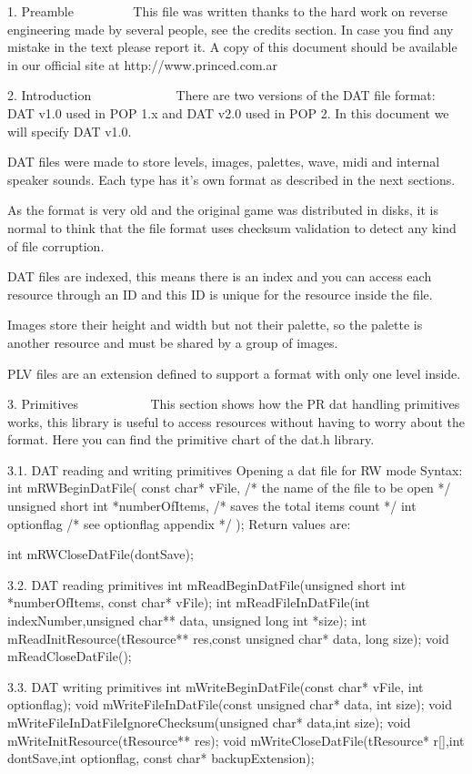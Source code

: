1. Preamble
   ~~~~~~~~
 This file was written thanks to the hard work on reverse engineering made
 by several people, see the credits section. In case you find any mistake
 in the text please report it. A copy of this document should be available
 in our official site at http://www.princed.com.ar


2. Introduction
   ~~~~~~~~~~~~
 There are two versions of the DAT file format: DAT v1.0 used in POP 1.x
 and DAT v2.0 used in POP 2. In this document we will specify DAT v1.0.

 DAT files were made to store levels, images, palettes, wave, midi and
 internal speaker sounds. Each type has it's own format as described in
 the next sections.
 
 As the format is very old and the original game was distributed in disks,
 it is normal to think that the file format uses checksum validation to
 detect any kind of file corruption.

 DAT files are indexed, this means there is an index and you can access
 each resource through an ID and this ID is unique for the resource inside
 the file.

 Images store their height and width but not their palette, so the palette
 is another resource and must be shared by a group of images.

 PLV files are an extension defined to support a format with only one level
 inside.


3. Primitives
   ~~~~~~~~~~
 This section shows how the PR dat handling primitives works, this library
 is useful to access resources without having to worry about the format.
 Here you can find the primitive chart of the dat.h library.

3.1. DAT reading and writing primitives
 Opening a dat file for RW mode
 Syntax:
 int mRWBeginDatFile(
  const char* vFile, /* the name of the file to be open */
  unsigned short int *numberOfItems, /* saves the total items count */
  int optionflag /* see optionflag appendix */
 );
 Return values are:

 int mRWCloseDatFile(dontSave);

3.2. DAT reading primitives
 int  mReadBeginDatFile(unsigned short int *numberOfItems,
      const char* vFile);
 int  mReadFileInDatFile(int indexNumber,unsigned char** data,
      unsigned long int *size);
 int  mReadInitResource(tResource** res,const unsigned char* data,
      long size);
 void mReadCloseDatFile();

3.3. DAT writing primitives
 int  mWriteBeginDatFile(const char* vFile, int optionflag);
 void mWriteFileInDatFile(const unsigned char* data, int size);
 void mWriteFileInDatFileIgnoreChecksum(unsigned char* data,int size);
 void mWriteInitResource(tResource** res);
 void mWriteCloseDatFile(tResource* r[],int dontSave,int optionflag, const
      char* backupExtension);


